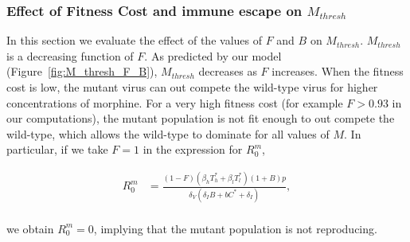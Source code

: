 \documentclass[11pt, oneside]{article}    %
\begin{document}
\subsubsection{Effect of Fitness Cost and immune escape on $M_{thresh}$}

In this section we evaluate the effect of the values of $F$ and $B$ on $M_{thresh}$. $M_{thresh}$ is a decreasing function of $F$. As predicted by our model (Figure~\ref{fig:M_thresh_F_B}), $M_{thresh}$ decreases as $F$ increases. When the fitness cost is low, the mutant virus can out compete the wild-type virus for higher concentrations of morphine. For a very high fitness cost (for example $F>0.93$ in our computations), the mutant population is not fit enough to out compete the wild-type, which allows the wild-type to dominate for all values of $M$. In particular, if we take $F=1$ in the expression for $R_0^m$,


\begin{align*}
R_0^m &= \frac{(1-F)(\beta_h T_h^* +  \beta_l T_l^*)(1+B)p}{\delta_V (\delta_I B + bC^* + \delta_I)},  \\
\end{align*}

we obtain $R_0^m = 0$, implying that the mutant population is not reproducing.
\end{document}
